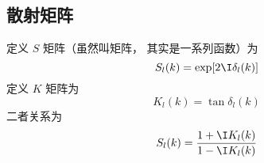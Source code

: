 \subsection{散射矩阵}
定义 $S$ 矩阵（虽然叫矩阵， 其实是一系列函数）为
\begin{equation}
S_l(k) = \exp[2\I\delta_l(k)]
\end{equation}
定义 $K$ 矩阵为
\begin{equation}
K_l(k) = \tan \delta_l(k)
\end{equation}
二者关系为
\begin{equation}
S_l(k) = \frac{1 + \I K_l(k)}{1 - \I K_l(k)}
\end{equation}
